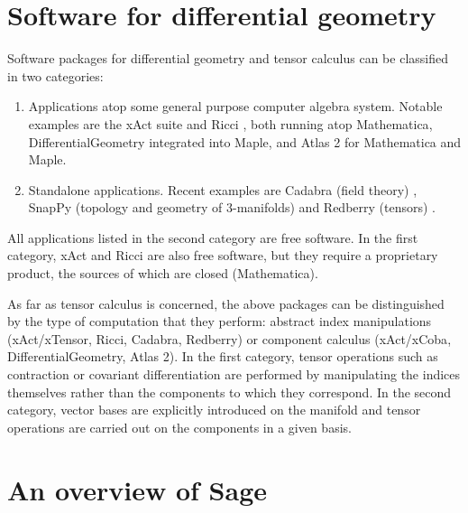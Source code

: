 \documentclass[a4paper]{jpconf}
\newcommand{\soft}[1]{\textsf{#1}}
\begin{document}

\section{Software for differential geometry}

Software packages for differential geometry and tensor calculus can be 
classified in two categories: 
\begin{enumerate}
\item Applications atop some general purpose computer algebra system. 
Notable examples are 
the \soft{xAct} suite \cite{Marti08} and \soft{Ricci} \cite{Ricci}, both
running atop \soft{Mathematica},
\soft{DifferentialGeometry} \cite{AnderT12} integrated into \soft{Maple}, and \soft{Atlas 2}
\cite{Atlas2} for \soft{Mathematica} and \soft{Maple}.
\item Standalone applications. Recent examples are \soft{Cadabra}  (field theory) \cite{Peete07},
\soft{SnapPy} (topology and geometry of 3-manifolds) \cite{SnapPy} and
\soft{Redberry} (tensors) \cite{BolotP13}.
\end{enumerate}
All applications listed in the second category are free software. In
the first category, \soft{xAct} and \soft{Ricci} are also free software, but
they require a proprietary product, the sources of which are closed (\soft{Mathematica}).

As far as tensor calculus is concerned, the above packages can be distinguished by 
the type of computation that they perform: abstract index manipulations 
(\soft{xAct/xTensor}, \soft{Ricci}, \soft{Cadabra}, \soft{Redberry})
or component calculus (\soft{xAct/xCoba}, \soft{DifferentialGeometry},
\soft{Atlas 2}). 
In the first category, tensor operations such as contraction or covariant differentiation 
are performed by manipulating the indices themselves rather than the components 
to which they correspond. In the second category, vector bases are explicitly 
introduced on the manifold and tensor operations are carried out on the components 
in a given basis.



\section{An overview of Sage}
\end{document}
